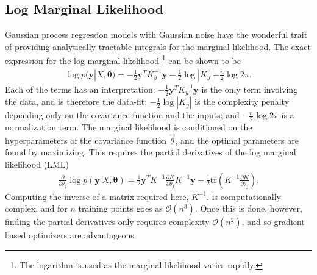 \documentclass[twoside,english]{uiofysmaster}
\begin{document}

\subsection{Log Marginal Likelihood}

Gaussian process regression models with Gaussian noise have the wonderful trait of providing analytically tractable integrals for the marginal likelihood. The exact expression for the log marginal likelihood \footnote{The logarithm is used as the marginal likelihood varies rapidly.} can be shown to be \cite{rasmussen2006gaussian}
\begin{align}
\log p(\textbf{y}|X, \boldsymbol{\theta}) = - \frac{1}{2} \textbf{y}^T K_y^{-1} \textbf{y} - \frac{1}{2} \log |K_y| - \frac{n}{2} \log 2 \pi.
\end{align}
Each of the terms has an interpretation: $- \frac{1}{2} \textbf{y}^T K_y^{-1} \textbf{y}$ is the only term involving the data, and is therefore the data-fit; $-\frac{1}{2} \log |K_y|$ is the complexity penalty depending only on the covariance function and the inputs; and $- \frac{n}{2} \log 2 \pi$ is a normalization term. The marginal likelihood is conditioned on the hyperparameters of the covariance function $\vec{\theta}$, and the optimal parameters are found by maximizing. This requires the partial derivatives of the log marginal likelihood (LML)
\begin{align}
\frac{\partial}{\partial \theta_j}
 \log p(\textbf{y}|X, \boldsymbol{\theta}) = \frac{1}{2} \textbf{y}^T K^{-1} \frac{\partial K}{\partial \theta_j} K^{-1} \textbf{y} - \frac{1}{2} \text{tr} (K^{-1} \frac{\partial K}{\partial \theta_j}).
\end{align}
Computing the inverse of a matrix required here, $K^{-1}$, is computationally complex, and for $n$ training points goes as $\mathcal{O}(n^3)$. Once this is done, however, finding the partial derivatives only requires complexity $\mathcal{O}(n^2)$, and so gradient based optimizers are advantageous.
\end{document}
